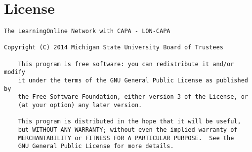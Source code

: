 \chapter{License}
\begin{verbatim}
The LearningOnline Network with CAPA - LON-CAPA
 
Copyright (C) 2014 Michigan State University Board of Trustees

    This program is free software: you can redistribute it and/or modify
    it under the terms of the GNU General Public License as published by
    the Free Software Foundation, either version 3 of the License, or
    (at your option) any later version.

    This program is distributed in the hope that it will be useful,
    but WITHOUT ANY WARRANTY; without even the implied warranty of
    MERCHANTABILITY or FITNESS FOR A PARTICULAR PURPOSE.  See the
    GNU General Public License for more details.
\end{verbatim}
